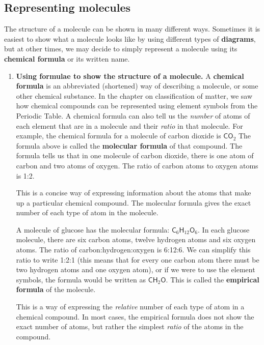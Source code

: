            \subsection*{Representing molecules}
            \nopagebreak
        \label{m38120*id307557}The structure of a molecule can be shown in many 
different ways. Sometimes it is easiest to show what a molecule looks like by 
using different types of \textbf{diagrams}, but at 
other times, we may decide to simply represent a molecule using its \textbf{chemical formula} or its written name.\par 
        \label{m38120*id307573}\begin{enumerate}[noitemsep, label=\textbf{\arabic*}. ] 
            \label{m38120*uid2}\item \textbf{Using formulae to show the structure of a 
molecule.}
A \textbf{chemical formula} is an abbreviated 
(shortened) way of describing a molecule, or some other chemical substance. In 
the chapter on classification of matter, we saw how chemical compounds can be 
represented using element symbols from the Periodic Table. A chemical formula 
can also tell us the \textsl{number} of atoms of 
each element that are in a molecule and their \textsl{ratio} in that molecule.
For example, the chemical formula for a molecule of carbon dioxide is
${\mathsf{CO}}_{2}$
The formula above is called the \textbf{molecular 
formula} of that compound. The formula tells us that in one molecule 
of carbon dioxide, there is one atom of carbon and two atoms of oxygen. The 
ratio of carbon atoms to oxygen atoms is 1:2.
\vspace{\rubberspace}\par
        \label{m38120*fhsst!!!underscore!!!id87}
  { \label{m38120*meaningfhsst!!!underscore!!!id87}
This is a concise way of expressing information about the atoms that make up a 
particular chemical compound. The molecular formula gives the exact number of 
each type of atom in the molecule. 
 } 

A molecule of glucose has the molecular formula:
${\mathsf{C}}_{6}{\mathsf{H}}_{12}{\mathsf{O}}_{6}$.
In each glucose molecule, there are six carbon atoms, twelve hydrogen atoms and 
six oxygen atoms. The ratio of carbon:hydrogen:oxygen is 6:12:6. We can simplify 
this ratio to write 1:2:1 (this means that for every one carbon atom there must be two hydrogen atoms and one oxygen atom), or if we were to use the element symbols, the formula 
would be written as ${\mathsf{CH}}_{2}\mathsf{O}$. This is called the \textbf{empirical formula} of the molecule.
\vspace{\rubberspace}\par
        \label{m38120*fhsst!!!underscore!!!id93}
 { \label{m38120*meaningfhsst!!!underscore!!!id93}
This is a way of expressing the \textsl{relative} 
number of each type of atom in a chemical compound. In most cases, the empirical 
formula does not show the exact number of atoms, but rather the simplest 
\textsl{ratio} of the atoms in the compound. 
 } 


\end{enumerate}
